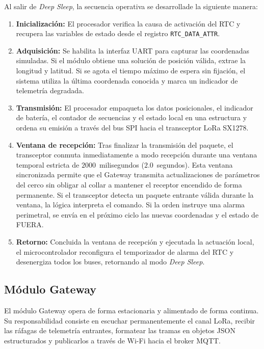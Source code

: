 Al salir de \textit{Deep Sleep}, la secuencia operativa se desarrollade la siguiente manera:
\begin{enumerate}
    \item \textbf{Inicialización:} El procesador verifica la causa de activación del RTC y recupera las variables de estado desde el registro \texttt{RTC\_DATA\_ATTR}.
    \item \textbf{Adquisición:} Se habilita la interfaz UART para capturar las coordenadas simuladas. Si el módulo obtiene una solución de posición válida, extrae la longitud y latitud. Si se agota el tiempo máximo de espera sin fijación, el sistema utiliza la última coordenada conocida y marca un indicador de telemetría degradada.
    \item \textbf{Transmisión:} El procesador empaqueta los datos posicionales, el indicador de batería, el contador de secuencias y el estado local en una estructura y ordena su emisión a través del bus SPI hacia el transceptor LoRa SX1278.
    \item \textbf{Ventana de recepción:} Tras finalizar la transmisión del paquete, el transceptor conmuta inmediatamente a modo recepción durante una ventana temporal estricta de $2000$~milisegundos ($2.0$~segundos). Esta ventana sincronizada permite que el Gateway transmita actualizaciones de parámetros del cerco sin obligar al collar a mantener el receptor encendido de forma permanente. Si el transceptor detecta un paquete entrante válida durante la ventana, la lógica interpreta el comando. Si la orden instruye una alarma perimetral, se envía en el próximo ciclo las nuevas coordenadas y el estado de FUERA.
    \item \textbf{Retorno:} Concluida la ventana de recepción y ejecutada la actuación local, el microcontrolador reconfigura el temporizador de alarma del RTC y desenergiza todos los buses, retornando al modo \textit{Deep Sleep}.
\end{enumerate}

\subsection{Módulo Gateway}

El módulo Gateway  opera de forma estacionaria y alimentado de forma continua. Su responsabilidad consiste en escuchar permanentemente el canal LoRa, recibir las ráfagas de telemetría entrantes, formatear las tramas en objetos JSON estructurados y publicarlos a través de Wi-Fi hacia el broker MQTT.

